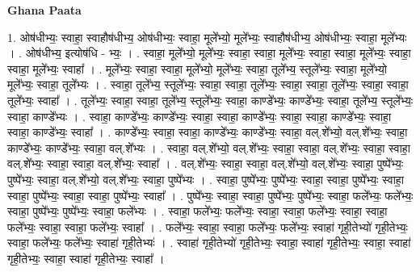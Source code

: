 \documentclass[17pt]{extarticle}
\begin{document}
\textbf{Ghana Paata } \newline

1. ओष॑धीभ्यः॒ स्वाहा॒ स्वाहौष॑धीभ्य॒ ओष॑धीभ्यः॒ स्वाहा॒ मूले᳚भ्यो॒ मूले᳚भ्यः॒ स्वाहौष॑धीभ्य॒ ओष॑धीभ्यः॒ स्वाहा॒ मूले᳚भ्यः । . ओष॑धीभ्य॒ इत्योष॑धि - भ्यः॒ । . स्वाहा॒ मूले᳚भ्यो॒ मूले᳚भ्यः॒ स्वाहा॒ स्वाहा॒ मूले᳚भ्यः॒ स्वाहा॒ स्वाहा॒ मूले᳚भ्यः॒ स्वाहा॒ स्वाहा॒ मूले᳚भ्यः॒ स्वाहा᳚ । . मूले᳚भ्यः॒ स्वाहा॒ स्वाहा॒ मूले᳚भ्यो॒ मूले᳚भ्यः॒ स्वाहा॒ तूले᳚भ्य॒ स्तूले᳚भ्यः॒ स्वाहा॒ मूले᳚भ्यो॒ मूले᳚भ्यः॒ स्वाहा॒ तूले᳚भ्यः । . स्वाहा॒ तूले᳚भ्य॒ स्तूले᳚भ्यः॒ स्वाहा॒ स्वाहा॒ तूले᳚भ्यः॒ स्वाहा॒ स्वाहा॒ तूले᳚भ्यः॒ स्वाहा॒ स्वाहा॒ तूले᳚भ्यः॒ स्वाहा᳚ । . तूले᳚भ्यः॒ स्वाहा॒ स्वाहा॒ तूले᳚भ्य॒ स्तूले᳚भ्यः॒ स्वाहा॒ काण्डे᳚भ्यः॒ काण्डे᳚भ्यः॒ स्वाहा॒ तूले᳚भ्य॒ स्तूले᳚भ्यः॒ स्वाहा॒ काण्डे᳚भ्यः । . स्वाहा॒ काण्डे᳚भ्यः॒ काण्डे᳚भ्यः॒ स्वाहा॒ स्वाहा॒ काण्डे᳚भ्यः॒ स्वाहा॒ स्वाहा॒ काण्डे᳚भ्यः॒ स्वाहा॒ स्वाहा॒ काण्डे᳚भ्यः॒ स्वाहा᳚ । . काण्डे᳚भ्यः॒ स्वाहा॒ स्वाहा॒ काण्डे᳚भ्यः॒ काण्डे᳚भ्यः॒ स्वाहा॒ वल्.शे᳚भ्यो॒ वल्.शे᳚भ्यः॒ स्वाहा॒ काण्डे᳚भ्यः॒ काण्डे᳚भ्यः॒ स्वाहा॒ वल्.शे᳚भ्यः । . स्वाहा॒ वल्.शे᳚भ्यो॒ वल्.शे᳚भ्यः॒ स्वाहा॒ स्वाहा॒ वल्.शे᳚भ्यः॒ स्वाहा॒ स्वाहा॒ वल्.शे᳚भ्यः॒ स्वाहा॒ स्वाहा॒ वल्.शे᳚भ्यः॒ स्वाहा᳚ । . वल्.शे᳚भ्यः॒ स्वाहा॒ स्वाहा॒ वल्.शे᳚भ्यो॒ वल्.शे᳚भ्यः॒ स्वाहा॒ पुष्पे᳚भ्यः॒ पुष्पे᳚भ्यः॒ स्वाहा॒ वल्.शे᳚भ्यो॒ वल्.शे᳚भ्यः॒ स्वाहा॒ पुष्पे᳚भ्यः । . स्वाहा॒ पुष्पे᳚भ्यः॒ पुष्पे᳚भ्यः॒ स्वाहा॒ स्वाहा॒ पुष्पे᳚भ्यः॒ स्वाहा॒ स्वाहा॒ पुष्पे᳚भ्यः॒ स्वाहा॒ स्वाहा॒ पुष्पे᳚भ्यः॒ स्वाहा᳚ । . पुष्पे᳚भ्यः॒ स्वाहा॒ स्वाहा॒ पुष्पे᳚भ्यः॒ पुष्पे᳚भ्यः॒ स्वाहा॒ फले᳚भ्यः॒ फले᳚भ्यः॒ स्वाहा॒ पुष्पे᳚भ्यः॒ पुष्पे᳚भ्यः॒ स्वाहा॒ फले᳚भ्यः । . स्वाहा॒ फले᳚भ्यः॒ फले᳚भ्यः॒ स्वाहा॒ स्वाहा॒ फले᳚भ्यः॒ स्वाहा॒ स्वाहा॒ फले᳚भ्यः॒ स्वाहा॒ स्वाहा॒ फले᳚भ्यः॒ स्वाहा᳚ । . फले᳚भ्यः॒ स्वाहा॒ स्वाहा॒ फले᳚भ्यः॒ फले᳚भ्यः॒ स्वाहा॑ गृही॒तेभ्यो॑ गृही॒तेभ्यः॒ स्वाहा॒ फले᳚भ्यः॒ फले᳚भ्यः॒ स्वाहा॑ गृही॒तेभ्यः॑ । . स्वाहा॑ गृही॒तेभ्यो॑ गृही॒तेभ्यः॒ स्वाहा॒ स्वाहा॑ गृही॒तेभ्यः॒ स्वाहा॒ स्वाहा॑ गृही॒तेभ्यः॒ स्वाहा॒ स्वाहा॑ गृही॒तेभ्यः॒ स्वाहा᳚ । \newline
\end{document}
